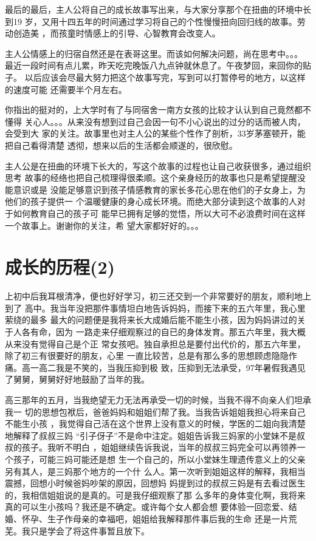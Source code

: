 \documentclass[12pt]{book}
\begin{document}
最后的最后，主人公将自己的成长故事写出来，与大家分享那个在扭曲的环境中长到19
岁，又用十四五年的时间通过学习将自己的个性慢慢扭向回归线的故事。劳动创造美
，而孩童时情感上的引导、心智教育会改变人。

主人公情感上的归宿自然还是在表哥这里。而该如何解决问题，尚在思考中。。。
\linebreak
\linebreak
最近一段时间有点儿累，昨天吃完晚饭八九点钟就休息了。午夜梦回，来回你的贴子。
以后应该会尽最大努力把这个故事写完，写到可以打暂停号的地方，以这样的速度可能
还需要半个月左右。

你指出的挺对的，上大学时有了与同宿舍一南方女孩的比较才认认到自己竟然都不懂得
关心人。。。从来没有想到过自己会因一句不小心说出的过分的话而被人肉，会受到大
家的关注。故事里也对主人公的某些个性作了剖析，33岁茅塞顿开，能把自己看得清楚
透彻，想来以后的生活都会顺遂的，很欣慰。

主人公是在扭曲的环境下长大的，写这个故事的过程也让自己收获很多，通过组织思考
故事的经络也把自己梳理得很柔顺。这个亲身经历的故事也只是希望提醒没能意识或是
没能足够意识到孩子情感教育的家长多花心思在他们的子女身上，为他们的孩子提供一
个温暖健康的身心成长环境。而绝大部分读到这个故事的人对于如何教育自己的孩子可
能早已拥有足够的觉悟，所以大可不必浪费时间在这样一个故事上。谢谢你的关注，希
望大家都好好的。。。
\section{成长的历程(2)}
\label{sec-9-37}

上初中后我耳根清净，便也好好学习，初三还交到一个非常要好的朋友，顺利地上到了
高中。我当年没把那件事情坦白地告诉妈妈，而接下来的五六年里，我心里萦绕的最多
最大的问题便是我将来长大成婚后能不能生小孩，因为妈妈讲过的关于人各有命，因为
一路走来仔细观察过的自已的身体发育。那五六年里，我大概从来没有觉得自己是个正
常女孩吧。独自承担总是要付出代价的，那五六年里，除了初三有很要好的朋友，心里
一直比较苦，总是有那么多的思想顾虑隐隐作痛。高一高二我是不笑的，当我压抑到极
致，压抑到无法承受，97年暑假我遇见了舅舅，舅舅好好地鼓励了当年的我。 

高三那年的五月，当我绝望无力无法再承受一切的时候，当我不得不向亲人们坦承我一
切的思想包袱后，爸爸妈妈和姐姐们帮了我。当我告诉姐姐我担心将来自己不能生小孩
，我觉得自己活在这个世界上没有意义的时候，学医的二姐向我清楚地解释了叔叔三妈
“引子伢子”不是命中注定。姐姐告诉我三妈家的小堂妹不是叔叔的孩子。我听不明白
，姐姐继续告诉我说，当年的叔叔三妈完全可以再领养一个孩子，可能三妈可能还是想
生一个自己的，所以小堂妹生理遗传意义上的父亲另有其人，是三妈那个地方的一个什
么人。第一次听到姐姐这样的解释，我相当震撼，回想小时候爸妈吵架的原因，回想妈
妈提到过的叔叔三妈是有去看过医生的，我相信姐姐说的是真的。可是我仔细观察了那
么多年的身体变化啊，我将来真的可以生小孩吗？我还是不确定。或许每个女人都会想
要体验一回恋爱、结婚、怀孕、生子作母亲的幸福吧，姐姐给我解释那件事后我的生命
还是一片荒芜。我只是学会了将这件事暂且放下。
\end{document}
